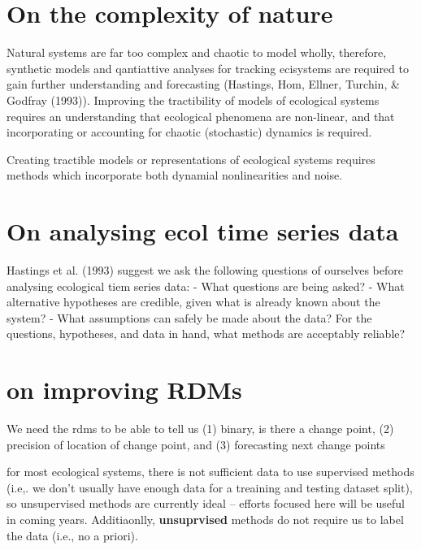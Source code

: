 \documentclass[12pt,twoside,openany]{reedthesis}
\begin{document}
\hypertarget{on-the-complexity-of-nature}{%
\section{On the complexity of nature}\label{on-the-complexity-of-nature}}

Natural systems are far too complex and chaotic to model wholly, therefore, synthetic models and qantiattive analyses for tracking ecisystems are required to gain further understanding and forecasting (Hastings, Hom, Ellner, Turchin, \& Godfray (1993)). Improving the tractibility of models of ecological systems requires an understanding that ecological phenomena are non-linear, and that incorporating or accounting for chaotic (stochastic) dynamics is required.

Creating tractible models or representations of ecological systems requires methods which incorporate both dynamial nonlinearities and noise.

\hypertarget{on-analysing-ecol-time-series-data}{%
\section{On analysing ecol time series data}\label{on-analysing-ecol-time-series-data}}

Hastings et al. (1993) suggest we ask the following questions of ourselves before analysing ecological tiem series data:
- What questions are being asked?
- What alternative hypotheses are credible, given what is already known about the system?
- What assumptions can safely be made about the data? For the questions, hypotheses, and data in hand, what methods are acceptably reliable?

\hypertarget{on-improving-rdms}{%
\section{on improving RDMs}\label{on-improving-rdms}}

We need the rdms to be able to tell us (1) binary, is there a change point, (2) precision of location of change point, and (3) forecasting next change points

for most ecological systems, there is not sufficient data to use supervised methods (i.e,. we don't usually have enough data for a treaining and testing dataset split), so unsupervised methods are currently ideal -- efforts focused here will be useful in coming years. Additiaonlly, \textbf{unsuprvised} methods do not require us to label the data (i.e., no a priori).
\end{document}
